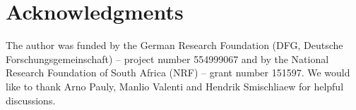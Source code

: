 \documentclass{lmcs}
\begin{document}
%




\section*{Acknowledgments}
The author was funded by the German Research Foundation (DFG, Deutsche Forschungsgemeinschaft) -- project number 554999067 and by the National Research Foundation of South Africa (NRF) -- grant number 151597.
We would like to thank Arno Pauly, Manlio Valenti and Hendrik Smischliaew for helpful discussions.
\end{document}
